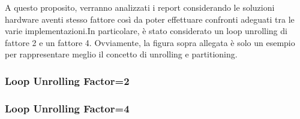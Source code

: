 A questo proposito, verranno analizzati i report considerando le soluzioni hardware aventi stesso fattore così da poter effettuare confronti adeguati tra le varie implementazioni.In particolare, è stato considerato un loop unrolling di fattore 2 e un fattore 4. Ovviamente, la figura sopra allegata è solo un esempio per rappresentare meglio il concetto di unrolling e partitioning.

\subsubsection{Loop Unrolling Factor=2}


\newpage

\subsubsection{Loop Unrolling Factor=4}

